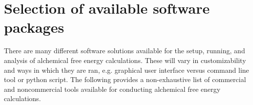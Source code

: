 \documentclass[9pt,bestpractices]{livecoms}
\begin{document}
\section{Selection of available software packages}

\label{sec:software}
There are many different software solutions available for the setup, running, and analysis of alchemical free energy calculations. These will vary in customizability and ways in which they are ran, e.g. graphical user interface versus command line tool or python script. The following provides a non-exhaustive list of commercial and noncommercial tools available for conducting alchemical free energy calculations. 
\begin{itemize}


\end{itemize}
\end{document}
